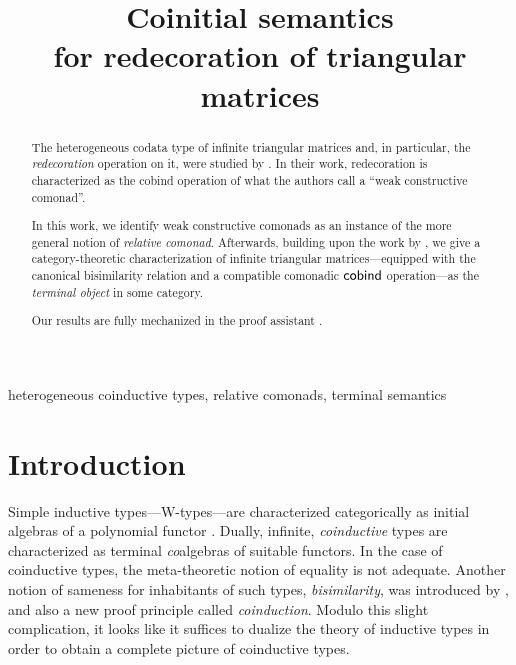 \documentclass[conference,10pt]{IEEEtran}
\begin{document}
\title{Coinitial semantics \\ for redecoration of triangular matrices}
\author{
}

\maketitle

\begin{abstract}
  The heterogeneous codata type of infinite triangular matrices and, in particular, the \emph{redecoration} operation on it, 
  were studied by \citeauthor{DBLP:conf/types/MatthesP11}. In their work,  redecoration is characterized
  as the cobind operation of what the authors call a \enquote{weak constructive comonad}.
  
  In this work, we identify weak constructive comonads as an instance of the more general notion of 
  \emph{relative comonad}.
  Afterwards, building upon the work by \citeauthor{DBLP:conf/types/MatthesP11}, we give a category-theoretic
  characterization of infinite triangular matrices---equipped with the canonical bisimilarity relation and a 
  compatible comonadic $\mathsf{cobind}$ operation---as the \emph{terminal object}
  in some category.
  
  Our results are fully mechanized in the proof assistant \coq.
  \end{abstract}


\begin{IEEEkeywords}
heterogeneous coinductive types,
relative comonads,
terminal semantics
\end{IEEEkeywords}

  

\section{Introduction}

 Simple inductive types---\textsf{W}-types---are characterized categorically as initial algebras of
 a polynomial functor \parencite{DBLP:journals/apal/MoerdijkP00}.
 Dually, infinite, \emph{coinductive} types are characterized as terminal \emph{co}algebras of suitable functors.
 In the case of coinductive types, the meta-theoretic notion of equality is not adequate. Another notion of sameness for inhabitants of such types, 
 \emph{bisimilarity}, was introduced by \textcite{aczel_nonwellfounded}, and also
 a new proof principle called \emph{coinduction}. 
 Modulo this slight complication, it looks like it suffices to dualize the theory of inductive types in order to obtain
 a complete picture of coinductive types.
\end{document}
